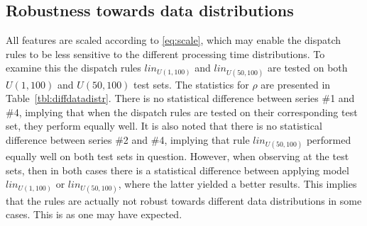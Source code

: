 \documentclass[10pt]{llncs}
\begin{document}
\subsection{Robustness towards data distributions}\label{sec:Expr:Robust}
All features are scaled according to \eqref{eq:scale}, which may enable the dispatch rules to be less sensitive to the different processing time distributions. 
To examine this the dispatch rules $lin_{U(1,100)}$ and $lin_{U(50,100)}$ are tested on both $U(1,100)$ and $U(50,100)$ test sets. The statistics for $\rho$ are presented in Table~\ref{tbl:diffdatadistr}. 
There is no statistical difference between series \#1 and \#4, implying that when the dispatch rules are tested on their corresponding test set, they perform equally well. It is also noted that there is no statistical difference between series \#2 and \#4, implying that rule $lin_{U(50,100)}$ performed equally well on both test sets in question. However, when observing at the test sets, then in both cases there is a statistical difference between applying model $lin_{U(1,100)}$ or $lin_{U(50,100)}$, where the latter yielded a better results. This implies that the rules are actually not robust towards different data distributions in some cases. This is as one may have expected.

\end{document}
